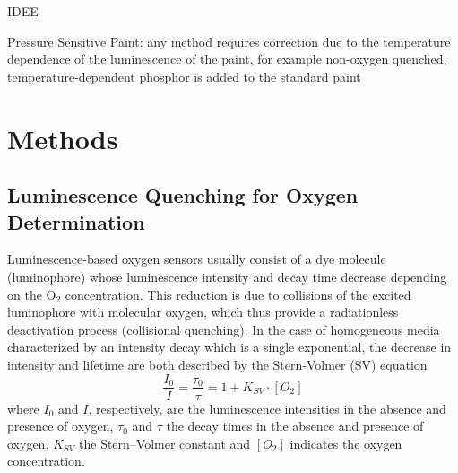 \documentclass[9pt,twocolumn,twoside,pdftex]{optica}
\begin{document}
IDEE

Pressure Sensitive Paint: any method requires correction due to the temperature dependence of the luminescence of the paint, for example non-oxygen quenched,  temperature-dependent  phosphor  is  added  to  the  standard  paint

\section{Methods}
\label{sec:methods}

\subsection{Luminescence Quenching for Oxygen Determination}
\label{Theory}

Luminescence-based oxygen sensors usually consist of a dye molecule (luminophore) whose luminescence intensity and decay time decrease depending on the O$_2$ concentration. This reduction is due to collisions of the excited luminophore with molecular oxygen, which thus provide a radiationless deactivation process (collisional quenching). 
In the case of homogeneous media characterized by an intensity decay which is a single exponential, the decrease in intensity and lifetime are both described by the Stern-Volmer (SV) equation \cite{Lakowicz2006}
\begin{equation}
\frac{I_0}{I}=\frac{\tau_0}{\tau}=1+K_{SV} \cdot \left[O_2\right]
\label{SVe}
\end{equation}
where $I_0$ and $I$, respectively, are the luminescence intensities in the absence and presence of oxygen, $\tau_0$ and $\tau$ the decay times in the absence and presence of oxygen, $K_{SV}$ the Stern–Volmer constant and $\left[O_2\right]$ indicates the oxygen concentration.
\end{document}
